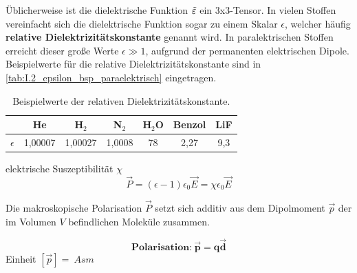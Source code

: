     Üblicherweise ist die dielektrische Funktion $\tilde{\varepsilon}$ ein 3x3-Tensor. In vielen Stoffen vereinfacht sich die dielektrische Funktion sogar zu einem Skalar $\epsilon$, welcher häufig \textbf{relative Dielektrizitätskonstante} genannt wird. In paralektrischen Stoffen erreicht dieser große Werte $\epsilon\gg1$, aufgrund der permanenten elektrischen Dipole. Beispielwerte für die relative Dielektrizitätskonstante sind in \autoref{tab:I.2_epsilon_bsp_paraelektrisch} eingetragen.
    \begin{table}[H]
        \centering
        \caption{Beispielwerte der relativen Dielektrizitätskonstante.}
        \begin{tabular}{|l||cccccc|}\hline
             &He&H${}_2$&N${}_2$&H${}_2$O&Benzol&LiF \\\hline
             $\epsilon$&1,00007&1,00027&1,0008&78&2,27&9,3\\\hline
        \end{tabular}
        \label{tab:I.2_epsilon_bsp_paraelektrisch}
    \end{table}
    \begin{definition}{elektrische Suszeptibilität $\chi$}
        \begin{equation}
            \vec P = (\epsilon-1)\epsilon_0\vec E = \chi\epsilon_0\vec E
            \label{eq:2.3}
        \end{equation}
    \end{definition}
    Die makroskopische Polarisation $\vec P$ setzt sich additiv aus dem Dipolmoment $\vec p$ der im Volumen $V$ befindlichen Moleküle zusammen.\\
    \begin{minipage}{0.6\linewidth}\vspace{3em}\hspace{1em}
        \centering
        
        \label{fig:placeholder}
    \end{minipage}
    \begin{minipage}{0.4\linewidth}
        \begin{important}
            \begin{equation}
                \textbf{Polarisation:}~\bm{\vec p= q\vec d}
            \end{equation}
            Einheit $[\vec p]=\SI{}{Asm}$
        \end{important}
    \end{minipage}

